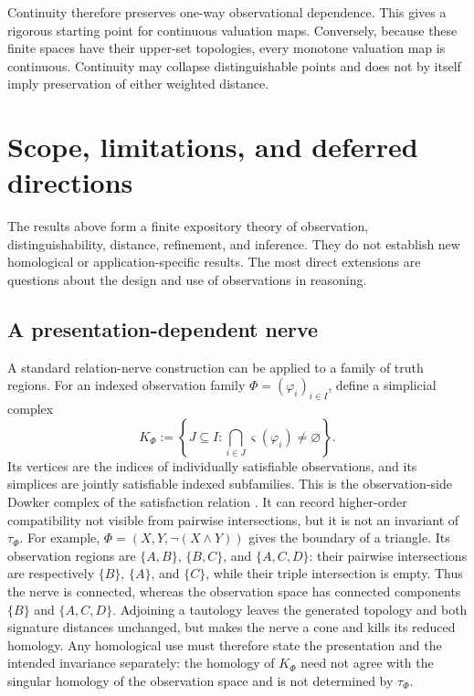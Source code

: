 \documentclass[11pt]{article}
\theoremstyle{definition}
\theoremstyle{plain}
\theoremstyle{remark}
\begin{document}
Continuity therefore preserves one-way observational dependence.  This gives
a rigorous starting point for continuous valuation maps.  Conversely, because
these finite spaces have their upper-set topologies, every monotone valuation
map is continuous.  Continuity may collapse distinguishable points and does not
by itself imply preservation of either weighted distance.

\section{Scope, limitations, and deferred directions}

The results above form a finite expository theory of observation,
distinguishability, distance, refinement, and inference.  They do not establish
new homological or application-specific results.  The most direct extensions
are questions about the design and use of observations in reasoning.

\subsection{A presentation-dependent nerve}

A standard relation-nerve construction can be applied to a family of truth
regions.  For an indexed observation family
$\Phi=(\varphi_i)_{i\in I}$, define a simplicial complex
\[
 K_\Phi:=\left\{J\subseteq I:
       \bigcap_{i\in J}\varsigma(\varphi_i)\neq\varnothing
       \right\}.
\]
Its vertices are the indices of individually satisfiable observations, and its
simplices are jointly satisfiable indexed subfamilies.  This is the
observation-side Dowker complex
of the satisfaction relation \cite{Dowker1952}.  It can record higher-order
compatibility not visible from pairwise intersections, but it is not an
invariant of $\tau_\Phi$.  For example,
$\Phi=(X,Y,\neg(X\wedge Y))$ gives the boundary of a triangle.  Its observation
regions are $\{A,B\}$, $\{B,C\}$, and $\{A,C,D\}$: their pairwise intersections
are respectively $\{B\}$, $\{A\}$, and $\{C\}$, while their triple intersection
is empty.  Thus the nerve is connected, whereas the observation space has
connected components $\{B\}$ and $\{A,C,D\}$.  Adjoining a
tautology leaves the generated topology and both signature distances unchanged,
but makes the nerve a cone and kills its reduced homology.  Any homological use
must therefore state the presentation and the intended invariance separately:
the homology of $K_\Phi$ need not agree with the singular homology of the
observation space and is not determined by $\tau_\Phi$.
\end{document}
